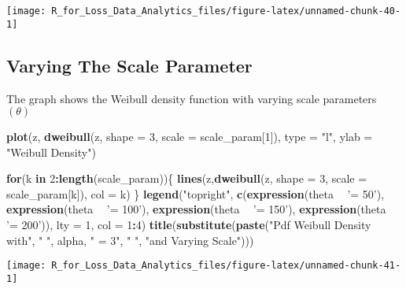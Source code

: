 \documentclass[]{book}
\newenvironment{Shaded}{\begin{snugshade}}{\end{snugshade}}
\newcommand{\KeywordTok}[1]{\textcolor[rgb]{0.13,0.29,0.53}{\textbf{#1}}}
\newcommand{\DataTypeTok}[1]{\textcolor[rgb]{0.13,0.29,0.53}{#1}}
\newcommand{\DecValTok}[1]{\textcolor[rgb]{0.00,0.00,0.81}{#1}}
\newcommand{\StringTok}[1]{\textcolor[rgb]{0.31,0.60,0.02}{#1}}
\newcommand{\ControlFlowTok}[1]{\textcolor[rgb]{0.13,0.29,0.53}{\textbf{#1}}}
\newcommand{\OperatorTok}[1]{\textcolor[rgb]{0.81,0.36,0.00}{\textbf{#1}}}
\newcommand{\NormalTok}[1]{#1}
\theoremstyle{definition}
\theoremstyle{definition}
\theoremstyle{definition}
\theoremstyle{remark}
\begin{document}
\begin{center}\texttt{[image: R\_for\_Loss\_Data\_Analytics\_files/figure-latex/unnamed-chunk-40-1]} \end{center}

\subsection{Varying The Scale
Parameter}\label{varying-the-scale-parameter-2}

The graph shows the Weibull density function with varying scale
parameters \((\theta)\)

\begin{Shaded}
\begin{Highlighting}[]
\KeywordTok{plot}\NormalTok{(z, }\KeywordTok{dweibull}\NormalTok{(z, }\DataTypeTok{shape =} \DecValTok{3}\NormalTok{, }\DataTypeTok{scale =}\NormalTok{ scale_param[}\DecValTok{1}\NormalTok{]), }
     \DataTypeTok{type =} \StringTok{"l"}\NormalTok{, }\DataTypeTok{ylab =} \StringTok{"Weibull Density"}\NormalTok{)}

\ControlFlowTok{for}\NormalTok{(k }\ControlFlowTok{in} \DecValTok{2}\OperatorTok{:}\KeywordTok{length}\NormalTok{(scale_param))\{}
  \KeywordTok{lines}\NormalTok{(z,}\KeywordTok{dweibull}\NormalTok{(z, }\DataTypeTok{shape =} \DecValTok{3}\NormalTok{, }\DataTypeTok{scale =}\NormalTok{ scale_param[k]), }\DataTypeTok{col =}\NormalTok{ k)}
\NormalTok{\}}
\KeywordTok{legend}\NormalTok{(}\StringTok{"topright"}\NormalTok{, }\KeywordTok{c}\NormalTok{(}\KeywordTok{expression}\NormalTok{(theta }\OperatorTok{~}\StringTok{ '= 50'}\NormalTok{), }\KeywordTok{expression}\NormalTok{(theta }\OperatorTok{~}\StringTok{ '= 100'}\NormalTok{), }
                     \KeywordTok{expression}\NormalTok{(theta }\OperatorTok{~}\StringTok{ '= 150'}\NormalTok{), }\KeywordTok{expression}\NormalTok{(theta }\OperatorTok{~}\StringTok{ '= 200'}\NormalTok{)), }
       \DataTypeTok{lty =} \DecValTok{1}\NormalTok{, }\DataTypeTok{col =} \DecValTok{1}\OperatorTok{:}\DecValTok{4}\NormalTok{)}
\KeywordTok{title}\NormalTok{(}\KeywordTok{substitute}\NormalTok{(}\KeywordTok{paste}\NormalTok{(}\StringTok{"Pdf Weibull Density with"}\NormalTok{, }\StringTok{" "}\NormalTok{, alpha, }\StringTok{" = 3"}\NormalTok{, }\StringTok{" "}\NormalTok{, }
                       \StringTok{"and Varying Scale"}\NormalTok{)))}
\end{Highlighting}
\end{Shaded}

\begin{center}\texttt{[image: R\_for\_Loss\_Data\_Analytics\_files/figure-latex/unnamed-chunk-41-1]} \end{center}
\end{document}
